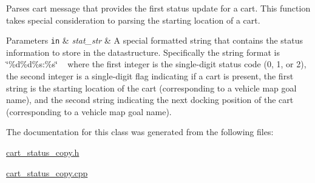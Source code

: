Parses cart message that provides the first status update for a cart. This function takes special consideration to parsing the starting location of a cart. 
\begin{DoxyParams}[1]{Parameters}
\mbox{\tt in}  & {\em stat\+\_\+str} & A special formatted string that contains the status information to store in the datastructure. Specifically the string format is \char`\"{}\%d\%d\%s\+:\%s\char`\"{} ~\newline
 where the first integer is the single-\/digit status code (0, 1, or 2), the second integer is a single-\/digit flag indicating if a cart is present, the first string is the starting location of the cart (corresponding to a vehicle map goal name), and the second string indicating the next docking position of the cart (corresponding to a vehicle map goal name). \\
\hline
\end{DoxyParams}


The documentation for this class was generated from the following files\+:\begin{DoxyCompactItemize}
\item 
\hyperlink{cart__status__copy_8h}{cart\+\_\+status\+\_\+copy.\+h}\item 
\hyperlink{cart__status__copy_8cpp}{cart\+\_\+status\+\_\+copy.\+cpp}\end{DoxyCompactItemize}
